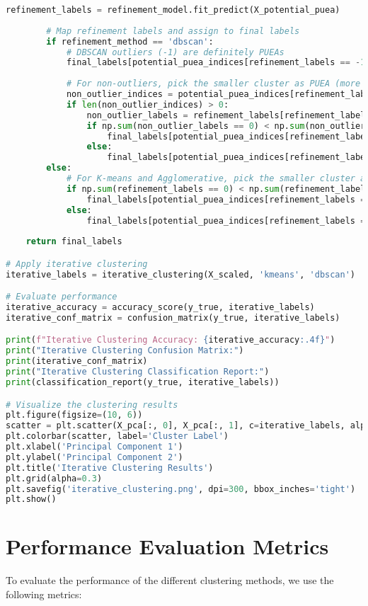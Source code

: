 \begin{lstlisting}[language=Python, caption=Iterative Clustering Method]
        refinement_labels = refinement_model.fit_predict(X_potential_puea)
        
        # Map refinement labels and assign to final labels
        if refinement_method == 'dbscan':
            # DBSCAN outliers (-1) are definitely PUEAs
            final_labels[potential_puea_indices[refinement_labels == -1]] = 1
            
            # For non-outliers, pick the smaller cluster as PUEA (more conservative approach)
            non_outlier_indices = potential_puea_indices[refinement_labels != -1]
            if len(non_outlier_indices) > 0:
                non_outlier_labels = refinement_labels[refinement_labels != -1]
                if np.sum(non_outlier_labels == 0) < np.sum(non_outlier_labels == 1):
                    final_labels[potential_puea_indices[refinement_labels == 0]] = 1
                else:
                    final_labels[potential_puea_indices[refinement_labels == 1]] = 1
        else:
            # For K-means and Agglomerative, pick the smaller cluster as PUEA
            if np.sum(refinement_labels == 0) < np.sum(refinement_labels == 1):
                final_labels[potential_puea_indices[refinement_labels == 0]] = 1
            else:
                final_labels[potential_puea_indices[refinement_labels == 1]] = 1
    
    return final_labels

# Apply iterative clustering
iterative_labels = iterative_clustering(X_scaled, 'kmeans', 'dbscan')

# Evaluate performance
iterative_accuracy = accuracy_score(y_true, iterative_labels)
iterative_conf_matrix = confusion_matrix(y_true, iterative_labels)

print(f"Iterative Clustering Accuracy: {iterative_accuracy:.4f}")
print("Iterative Clustering Confusion Matrix:")
print(iterative_conf_matrix)
print("Iterative Clustering Classification Report:")
print(classification_report(y_true, iterative_labels))

# Visualize the clustering results
plt.figure(figsize=(10, 6))
scatter = plt.scatter(X_pca[:, 0], X_pca[:, 1], c=iterative_labels, alpha=0.6, cmap='viridis')
plt.colorbar(scatter, label='Cluster Label')
plt.xlabel('Principal Component 1')
plt.ylabel('Principal Component 2')
plt.title('Iterative Clustering Results')
plt.grid(alpha=0.3)
plt.savefig('iterative_clustering.png', dpi=300, bbox_inches='tight')
plt.show()
\end{lstlisting}

\section{Performance Evaluation Metrics}
To evaluate the performance of the different clustering methods, we use the following metrics:

